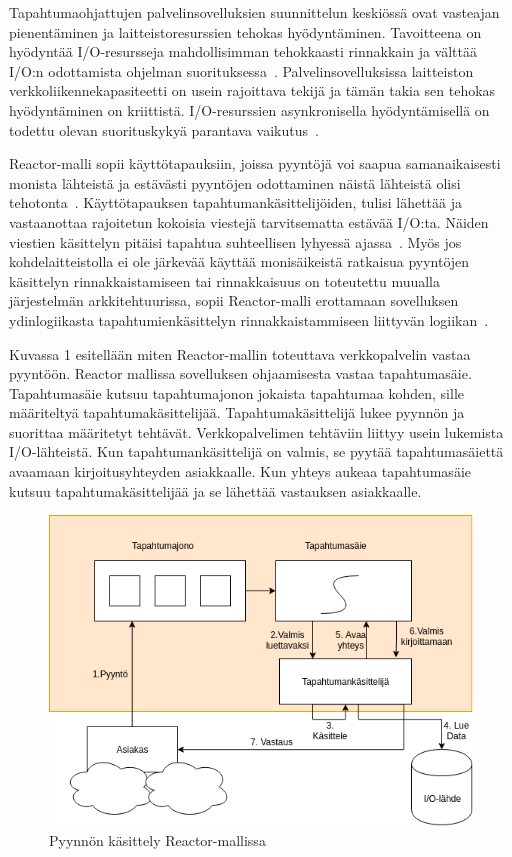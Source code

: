 \documentclass[finnish]{tktltiki2}
\theoremstyle{definition}
\theoremstyle{remark}
\begin{document}
Tapahtumaohjattujen palvelinsovelluksien suunnittelun keskiössä
ovat vasteajan pienentäminen ja laitteistoresurssien tehokas hyödyntäminen.
Tavoitteena on hyödyntää I/O-resursseja mahdollisimman tehokkaasti
rinnakkain ja välttää I/O:n odottamista ohjelman suorituksessa~\cite{pai_flash:_1999}.
Palvelinsovelluksissa
laitteiston verkkoliikennekapasiteetti on usein rajoittava tekijä ja tämän takia
sen tehokas hyödyntäminen on kriittistä. I/O-resurssien asynkronisella hyödyntämisellä on todettu
olevan suorituskykyä parantava vaikutus~\cite{hu_applying_1998}.

Reactor-malli sopii käyttötapauksiin, joissa pyyntöjä voi saapua
samanaikaisesti monista lähteistä ja estävästi
pyyntöjen odottaminen näistä lähteistä olisi tehotonta~\cite{schmidt_reactor:_1995}.
Käyttötapauksen tapahtumankäsittelijöiden, tulisi
lähettää ja vastaanottaa rajoitetun kokoisia viestejä
tarvitsematta estävää I/O:ta. Näiden viestien käsittelyn
pitäisi tapahtua suhteellisen lyhyessä ajassa~\cite{schmidt_reactor:_1995}.
Myös jos kohdelaitteistolla ei ole järkevää käyttää monisäikeistä
ratkaisua pyyntöjen käsittelyn rinnakkaistamiseen tai rinnakkaisuus
on toteutettu muualla järjestelmän arkkitehtuurissa, sopii Reactor-malli
erottamaan sovelluksen ydinlogiikasta tapahtumienkäsittelyn
rinnakkaistammiseen liittyvän logiikan~\cite{schmidt_reactor:_1995}.



Kuvassa 1 esitellään miten Reactor-mallin toteuttava verkkopalvelin
vastaa pyyntöön.
Reactor mallissa sovelluksen ohjaamisesta vastaa tapahtumasäie.
Tapahtumasäie kutsuu tapahtumajonon jokaista tapahtumaa kohden, sille
määriteltyä tapahtumakäsittelijää. Tapahtumakäsittelijä
lukee pyynnön ja suorittaa määritetyt tehtävät. Verkkopalvelimen
tehtäviin liittyy usein lukemista I/O-lähteistä.
Kun tapahtumankäsittelijä on valmis, se pyytää tapahtumasäiettä
avaamaan kirjoitusyhteyden asiakkaalle. Kun yhteys aukeaa
tapahtumasäie kutsuu tapahtumakäsittelijää ja se lähettää vastauksen
asiakkaalle.
\begin{figure}
    \centering
    \caption{Pyynnön käsittely Reactor-mallissa}
    \includegraphics[scale=0.5]{reactor.png}
\end{figure}
\end{document}
